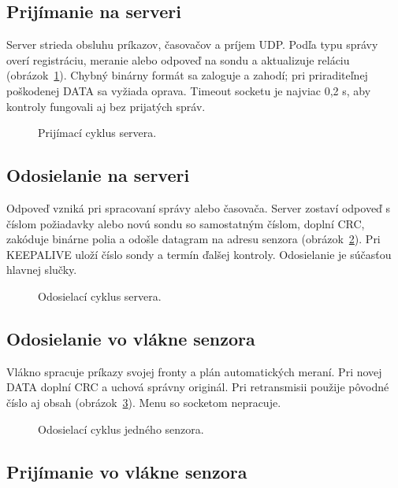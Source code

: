 \documentclass[12pt,a4paper]{article}
\begin{document}
\subsection{Prijímanie na serveri}

Server strieda obsluhu príkazov, časovačov a príjem UDP. Podľa typu správy overí registráciu, meranie alebo odpoveď na sondu a aktualizuje reláciu (obrázok~\ref{fig:server-receive}). Chybný binárny formát sa zaloguje a zahodí; pri priraditeľnej poškodenej DATA sa vyžiada oprava. Timeout socketu je najviac 0,2 s, aby kontroly fungovali aj bez prijatých správ.

\begin{figure}[!htbp]
\centering

\caption{Prijímací cyklus servera.}
\label{fig:server-receive}
\end{figure}

\clearpage
\subsection{Odosielanie na serveri}

Odpoveď vzniká pri spracovaní správy alebo časovača. Server zostaví odpoveď s číslom požiadavky alebo novú sondu so samostatným číslom, doplní CRC, zakóduje binárne polia a odošle datagram na adresu senzora (obrázok~\ref{fig:server-send}). Pri KEEPALIVE uloží číslo sondy a termín ďalšej kontroly. Odosielanie je súčasťou hlavnej slučky.

\begin{figure}[!htbp]
\centering

\caption{Odosielací cyklus servera.}
\label{fig:server-send}
\end{figure}

\clearpage
\subsection{Odosielanie vo vlákne senzora}

Vlákno spracuje príkazy svojej fronty a plán automatických meraní. Pri novej DATA doplní CRC a uchová správny originál. Pri retransmisii použije pôvodné číslo aj obsah (obrázok~\ref{fig:tester-send}). Menu so socketom nepracuje.

\begin{figure}[!htbp]
\centering

\caption{Odosielací cyklus jedného senzora.}
\label{fig:tester-send}
\end{figure}

\clearpage
\subsection{Prijímanie vo vlákne senzora}
\end{document}

